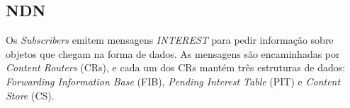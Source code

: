 \documentclass[conference]{IEEEtran}
\begin{document}


%

\subsection{NDN}

Os \textit{Subscribers} emitem mensagens \textit{INTEREST} para pedir informa\c{c}\~{a}o sobre objetos que chegam na forma de dados. As mensagens s\~{a}o encaminhadas por \textit{Content Routers} (CRs), e cada um dos CRs mant\'{e}m tr\^{e}s estruturas de dados: \textit{Forwarding Information Base} (FIB), \textit{Pending Interest Table} (PIT) e \textit{Content Store} (CS). \\
\end{document}
